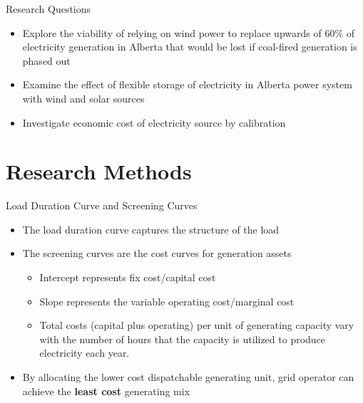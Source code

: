 \documentclass[newPxFont,numfooter,progressbar,sectionpages]{beamer}
\begin{document}

\begin{frame}[c]{Research Questions}

\begin{itemize}
	\item Explore the viability of relying on wind power to replace upwards of 60\% of electricity generation in Alberta that would be lost if coal-fired generation is phased out
	\item Examine the effect of flexible storage of electricity in Alberta power system with wind and solar sources
	\item Investigate economic cost of electricity source by calibration
	
\end{itemize}


\end{frame}


%
%
\section{Research Methods}





\begin{frame}[c]{Load Duration Curve and Screening Curves}

\begin{itemize}
	\item The load duration curve captures the structure of the load  
	\item The screening curves are the cost curves for generation assets
	\begin{itemize}
		\item Intercept represents fix cost/capital cost
		\item Slope represents the variable operating cost/marginal cost
		\item Total costs (capital plus operating) per unit of generating capacity vary with the
		number of hours that the capacity is utilized to produce electricity each year.		
	\end{itemize}
		
	\item By allocating the lower cost dispatchable generating unit, grid operator can achieve the \textbf{least cost} generating mix 
	
\end{itemize}


\end{frame}
\end{document}

